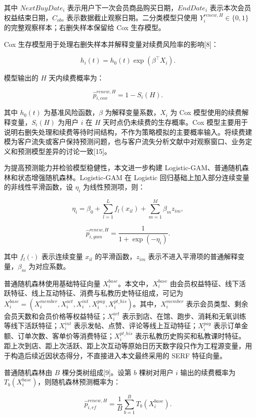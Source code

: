 \documentclass[
  12pt,
]{ctexart}
\begin{document}
其中 \(NextBuyDate_i\) 表示用户下一次会员商品购买日期，\(EndDate_i\) 表示本次会员权益结束日期，\(C_{obs}\) 表示数据截止观察日期。二分类模型只使用 \(Y_i^{renew,H}\in\{0,1\}\) 的完整观察样本；右删失样本保留给 Cox 生存模型。

Cox 生存模型用于处理右删失样本并解释变量对续费风险率的影响{[}8{]}：

\[
h_i(t)=h_0(t)\exp(\beta^\top X_i).
\tag{9}
\]

模型输出的 \(H\) 天内续费概率为：

\[
\hat p_{i,cox}^{renew,H}=1-S_i(H).
\tag{10}
\]

其中 \(h_0(t)\) 为基准风险函数，\(\beta\) 为解释变量系数，\(X_i\) 为 Cox 模型使用的续费解释变量，\(S_i(H)\) 为用户 \(i\) 在 \(H\) 天时点仍未续费的生存概率。Cox 模型主要用于说明右删失处理和续费等待时间结构，不作为策略模拟的主要概率输入。将续费建模为客户流失或客户保持预测问题，也与客户流失分析文献中对观察窗口、业务定义和预测模型差异的讨论一致{[}15{]}。

为提高预测能力并检验模型稳健性，本文进一步构建 Logistic-GAM、普通随机森林和状态增强随机森林。Logistic-GAM 在 Logistic 回归基础上加入部分连续变量的非线性平滑函数，设 \(\eta_i\) 为线性预测项，则：

\[
\eta_i=\beta_0+\sum_{l=1}^{L}f_l(x_{il})+\sum_{m=1}^{M}\beta_m z_{im},
\tag{11}
\]

\[
\hat p_{i,gam}^{renew,H}=\frac{1}{1+\exp(-\eta_i)}.
\tag{12}
\]

其中 \(f_l(\cdot)\) 表示连续变量 \(x_{il}\) 的平滑函数，\(z_{im}\) 表示不进入平滑项的普通解释变量，\(\beta_m\) 为对应系数。

普通随机森林使用基础特征向量 \(X_i^{base}\)。本文中，\(X_i^{base}\) 由会员权益特征、线下活跃特征、线上互动特征、消费与私教历史特征组成，可记为 \(X_i^{base}=(X_i^{member},X_i^{act},X_i^{int},X_i^{pay},X_i^{pt\_his})\)。其中，\(X_i^{member}\) 表示会员类型、剩余会员天数和会员价格等权益特征；\(X_i^{act}\) 表示到店、在馆、跑步、消耗和无氧训练等线下活跃特征；\(X_i^{int}\) 表示发帖、点赞、评论等线上互动特征；\(X_i^{pay}\) 表示订单金额、订单次数、客单价等消费特征；\(X_i^{pt\_his}\) 表示私教历史购买和私教课时特征。距上次到店、距上次活跃、距上次互动等原始日历天数字段只作为工程源变量，用于构造后续近因状态得分，不直接进入本文最终采用的 SERF 特征向量。

普通随机森林由 \(B\) 棵分类树组成{[}9{]}。设第 \(b\) 棵树对用户 \(i\) 输出的续费概率为 \(T_b(X_i^{base})\)，则随机森林预测概率为：

\[
\hat p_{i,rf}^{renew,H}=\frac{1}{B}\sum_{b=1}^{B}T_b(X_i^{base}).
\tag{13}
\]
\end{document}
